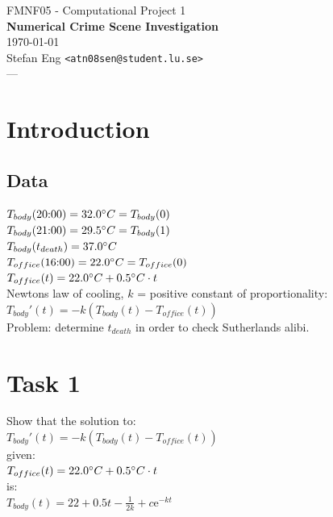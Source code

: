 \documentclass{article}
\begin{document}
\begin{center}
  {\small FMNF05 - Computational Project 1} \\
  {\Large\textbf{Numerical Crime Scene Investigation}} \\
  \vspace{0.4cm}
  \today\\
  \vspace{0.2cm}
  Stefan Eng \texttt{<atn08sen@student.lu.se>} \\
  \vspace{0.4cm}
  {\Large ---} \\
\end{center}

\section*{Introduction}

  \subsection*{Data}

  $T_{body}(\textrm{20:00}) = 32.0{\degree}C = T_{body}(0)$\\
  $T_{body}(\textrm{21:00}) = 29.5{\degree}C = T_{body}(1)$\\
  $T_{body}(t_{death}) = 37.0\degree{C} $ \\

  \noindent
  $T_{office}(\textrm{16:00}) = 22.0{\degree}C = T_{office}(0) $\\
  $T_{office}(t) = 22.0{\degree}C + 0.5{\degree}C \cdot t $\\

  \noindent
  Newtons law of cooling, $k$ = positive constant of proportionality: \\
  $T_{body}'(t) = -k(T_{body}(t) - T_{office}(t))$\\

  \noindent
  Problem: determine $t_{death}$ in order to check Sutherlands alibi.

\section*{Task 1}

  Show that the solution to: \\
  \hspace*{1cm}
  $T_{body}'(t) = -k(T_{body}(t) - T_{office}(t))$ \\
  given: \\
  \hspace*{1cm}
  $T_{office}(t) = 22.0{\degree}C + 0.5{\degree}C \cdot t $ \\
  is: \\
  \hspace*{1cm}
  $T_{body}(t) = 22 + 0.5t - \frac{1}{2k} + c\mathrm{e}^{-kt}$ \\
\end{document}
